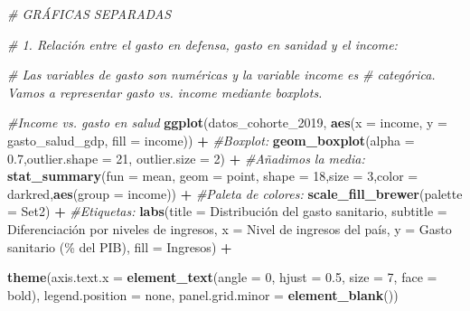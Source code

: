 \documentclass[notspecified,article,submit,moreauthors,pdftex]{Definitions/mdpi}
\newenvironment{Shaded}{\begin{snugshade}}{\end{snugshade}}
\newcommand{\AttributeTok}[1]{\textcolor[rgb]{0.13,0.29,0.53}{#1}}
\newcommand{\CommentTok}[1]{\textcolor[rgb]{0.56,0.35,0.01}{\textit{#1}}}
\newcommand{\DecValTok}[1]{\textcolor[rgb]{0.00,0.00,0.81}{#1}}
\newcommand{\FloatTok}[1]{\textcolor[rgb]{0.00,0.00,0.81}{#1}}
\newcommand{\FunctionTok}[1]{\textcolor[rgb]{0.13,0.29,0.53}{\textbf{#1}}}
\newcommand{\NormalTok}[1]{#1}
\newcommand{\SpecialCharTok}[1]{\textcolor[rgb]{0.81,0.36,0.00}{\textbf{#1}}}
\newcommand{\StringTok}[1]{\textcolor[rgb]{0.31,0.60,0.02}{#1}}
\begin{document}
\begin{Shaded}
\begin{Highlighting}[]
\CommentTok{\# GRÁFICAS SEPARADAS}

\CommentTok{\# 1. Relación entre el gasto en defensa, gasto en sanidad y el \textquotesingle{}income\textquotesingle{}:}

\CommentTok{\# Las variables de gasto son numéricas y la variable \textquotesingle{}income\textquotesingle{} es }
\CommentTok{\# categórica. Vamos a representar gasto vs. income mediante boxplots. }
 

\CommentTok{\#Income vs. gasto en salud}
\FunctionTok{ggplot}\NormalTok{(datos\_cohorte\_2019,}
       \FunctionTok{aes}\NormalTok{(}\AttributeTok{x =}\NormalTok{ income, }\AttributeTok{y =}\NormalTok{ gasto\_salud\_gdp,}
           \AttributeTok{fill =}\NormalTok{ income)) }\SpecialCharTok{+}
  \CommentTok{\#Boxplot:}
  \FunctionTok{geom\_boxplot}\NormalTok{(}\AttributeTok{alpha =} \FloatTok{0.7}\NormalTok{,}\AttributeTok{outlier.shape =} \DecValTok{21}\NormalTok{, }\AttributeTok{outlier.size =} \DecValTok{2}\NormalTok{) }\SpecialCharTok{+}
  \CommentTok{\#Añadimos la media:}
  \FunctionTok{stat\_summary}\NormalTok{(}\AttributeTok{fun =}\NormalTok{ mean, }\AttributeTok{geom =} \StringTok{\textquotesingle{}point\textquotesingle{}}\NormalTok{, }
               \AttributeTok{shape =} \DecValTok{18}\NormalTok{,}\AttributeTok{size =} \DecValTok{3}\NormalTok{,}\AttributeTok{color =} \StringTok{\textquotesingle{}darkred\textquotesingle{}}\NormalTok{,}\FunctionTok{aes}\NormalTok{(}\AttributeTok{group =}\NormalTok{ income)) }\SpecialCharTok{+}
  \CommentTok{\#Paleta de colores:}
  \FunctionTok{scale\_fill\_brewer}\NormalTok{(}\AttributeTok{palette =} \StringTok{\textquotesingle{}Set2\textquotesingle{}}\NormalTok{) }\SpecialCharTok{+}
  \CommentTok{\#Etiquetas:}
  \FunctionTok{labs}\NormalTok{(}\AttributeTok{title =} \StringTok{\textquotesingle{}Distribución del gasto sanitario\textquotesingle{}}\NormalTok{,}
       \AttributeTok{subtitle =} \StringTok{\textquotesingle{}Diferenciación por niveles de ingresos\textquotesingle{}}\NormalTok{,}
       \AttributeTok{x =} \StringTok{\textquotesingle{}Nivel de ingresos del país\textquotesingle{}}\NormalTok{,}
       \AttributeTok{y =} \StringTok{\textquotesingle{}Gasto sanitario (\% del PIB)\textquotesingle{}}\NormalTok{,}
       \AttributeTok{fill =} \StringTok{\textquotesingle{}Ingresos\textquotesingle{}}\NormalTok{) }\SpecialCharTok{+}

  \FunctionTok{theme}\NormalTok{(}\AttributeTok{axis.text.x =} \FunctionTok{element\_text}\NormalTok{(}\AttributeTok{angle =} \DecValTok{0}\NormalTok{, }\AttributeTok{hjust =} \FloatTok{0.5}\NormalTok{, }\AttributeTok{size =} \DecValTok{7}\NormalTok{, }\AttributeTok{face =} \StringTok{\textquotesingle{}bold\textquotesingle{}}\NormalTok{),}
        \AttributeTok{legend.position =} \StringTok{\textquotesingle{}none\textquotesingle{}}\NormalTok{, }
        \AttributeTok{panel.grid.minor =} \FunctionTok{element\_blank}\NormalTok{())}
\end{Highlighting}
\end{Shaded}
\end{document}
